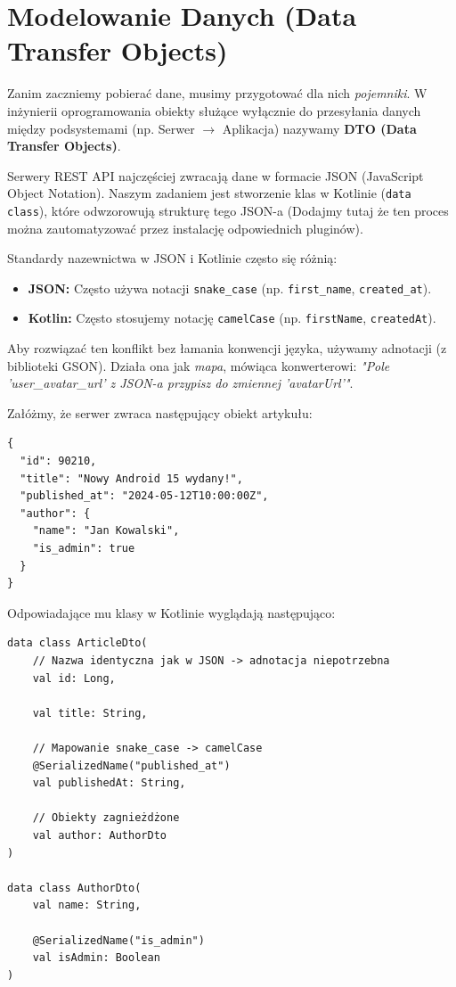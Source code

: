 \section{Modelowanie Danych (Data Transfer Objects)}

Zanim zaczniemy pobierać dane, musimy przygotować dla nich \textit{pojemniki}. W inżynierii oprogramowania obiekty służące wyłącznie do przesyłania danych między podsystemami (np. Serwer $\rightarrow$ Aplikacja) nazywamy \textbf{DTO (Data Transfer Objects)}.

Serwery REST API najczęściej zwracają dane w formacie JSON (JavaScript Object Notation). Naszym zadaniem jest stworzenie klas w Kotlinie (\texttt{data class}), które odwzorowują strukturę tego JSON-a (Dodajmy tutaj że ten proces można zautomatyzować przez instalację odpowiednich pluginów).

Standardy nazewnictwa w JSON i Kotlinie często się różnią:
\begin{itemize}
    \item \textbf{JSON:} Często używa notacji \texttt{snake\_case} (np. \texttt{first\_name}, \texttt{created\_at}).
    \item \textbf{Kotlin:} Często stosujemy notację \texttt{camelCase} (np. \texttt{firstName}, \texttt{createdAt}).
\end{itemize}

Aby rozwiązać ten konflikt bez łamania konwencji języka, używamy adnotacji  (z biblioteki GSON). Działa ona jak \textit{mapa}, mówiąca konwerterowi: \textit{"Pole 'user\_avatar\_url' z JSON-a przypisz do zmiennej 'avatarUrl'"}.

Załóżmy, że serwer zwraca następujący obiekt artykułu:

\begin{verbatim}
{
  "id": 90210,
  "title": "Nowy Android 15 wydany!",
  "published_at": "2024-05-12T10:00:00Z",
  "author": {
    "name": "Jan Kowalski",
    "is_admin": true
  }
}
\end{verbatim}

Odpowiadające mu klasy w Kotlinie wyglądają następująco:

\begin{verbatim}
data class ArticleDto(
    // Nazwa identyczna jak w JSON -> adnotacja niepotrzebna
    val id: Long,
    
    val title: String,
    
    // Mapowanie snake_case -> camelCase
    @SerializedName("published_at")
    val publishedAt: String,
    
    // Obiekty zagnieżdżone
    val author: AuthorDto
)

data class AuthorDto(
    val name: String,
    
    @SerializedName("is_admin")
    val isAdmin: Boolean
)
\end{verbatim}

